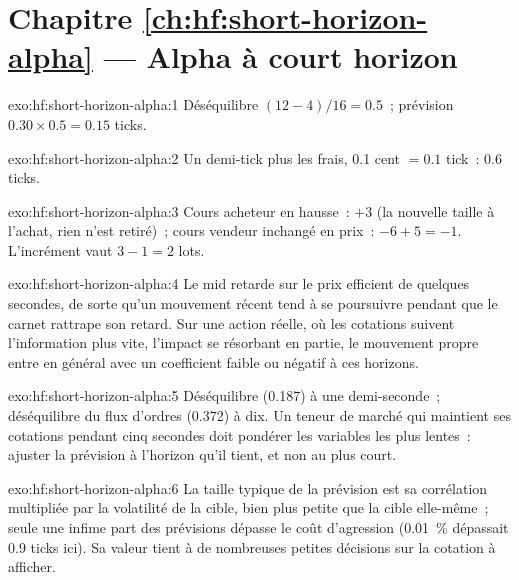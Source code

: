 \section*{Chapitre \ref{ch:hf:short-horizon-alpha} --- Alpha à court horizon}

\begin{solution}{exo:hf:short-horizon-alpha:1}
Déséquilibre $(12-4)/16=0.5$~; prévision $0.30\times0.5=0.15$ ticks.
\end{solution}

\begin{solution}{exo:hf:short-horizon-alpha:2}
Un demi-tick plus les frais, 0.1 cent $=0.1$ tick~: 0.6 ticks.
\end{solution}

\begin{solution}{exo:hf:short-horizon-alpha:3}
Cours acheteur en hausse~: $+3$ (la nouvelle taille à l'achat, rien n'est retiré)~; cours vendeur inchangé en prix~: $-6+5=-1$. L'incrément vaut $3-1=2$ lots.
\end{solution}

\begin{solution}{exo:hf:short-horizon-alpha:4}
Le mid retarde sur le prix efficient de quelques secondes, de sorte qu'un mouvement récent tend à se poursuivre pendant que le carnet rattrape son retard. Sur une action réelle, où les cotations suivent
l'information plus vite, l'impact se résorbant en partie, le mouvement propre entre en général avec un coefficient faible ou négatif à ces horizons.
\end{solution}

\begin{solution}{exo:hf:short-horizon-alpha:5}
Déséquilibre (0.187) à une demi-seconde~; déséquilibre du flux d'ordres (0.372) à dix. Un teneur de marché qui maintient ses cotations pendant cinq secondes doit pondérer les variables les plus lentes~:
ajuster la prévision à l'horizon qu'il tient, et non au plus court.
\end{solution}

\begin{solution}{exo:hf:short-horizon-alpha:6}
La taille typique de la prévision est sa corrélation multipliée par la volatilité de la cible, bien plus petite que la cible elle-même~; seule une infime part des prévisions
dépasse le coût d'agression (0.01~\% dépassait 0.9 ticks ici). Sa valeur tient à de nombreuses petites décisions sur la cotation à afficher.
\end{solution}

